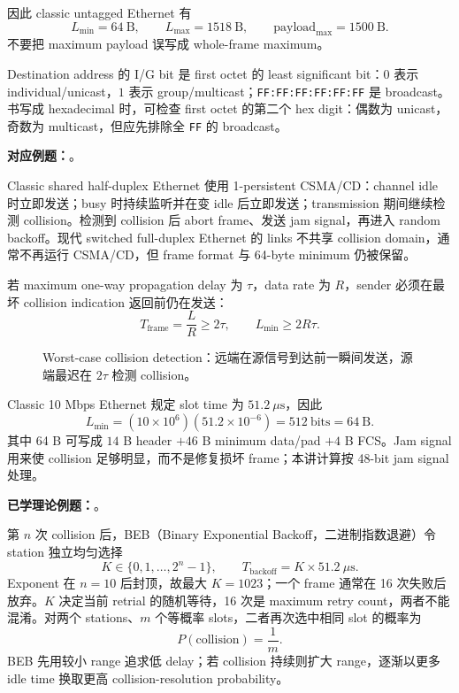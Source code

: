 因此 classic untagged Ethernet 有
\[
  \boxed{L_{\min}=64\ \text{B}},
  \qquad
  \boxed{L_{\max}=1518\ \text{B}},
  \qquad
  \boxed{\text{payload}_{\max}=1500\ \text{B}}.
\]
不要把 maximum payload 误写成 whole-frame maximum。

Destination address 的 I/G bit 是 first octet 的 least significant bit：$0$ 表示 individual/unicast，$1$ 表示 group/multicast；\texttt{FF:FF:FF:FF:FF:FF} 是 broadcast。书写成 hexadecimal 时，可检查 first octet 的第二个 hex digit：偶数为 unicast，奇数为 multicast，但应先排除全 \texttt{FF} 的 broadcast。

\textbf{对应例题：}。


Classic shared half-duplex Ethernet 使用 1-persistent CSMA/CD：channel idle 时立即发送；busy 时持续监听并在变 idle 后立即发送；transmission 期间继续检测 collision。检测到 collision 后 abort frame、发送 jam signal，再进入 random backoff。现代 switched full-duplex Ethernet 的 links 不共享 collision domain，通常不再运行 CSMA/CD，但 frame format 与 64-byte minimum 仍被保留。

若 maximum one-way propagation delay 为 $\tau$，data rate 为 $R$，sender 必须在最坏 collision indication 返回前仍在发送：
\[
  T_{\mathrm{frame}}=\frac{L}{R}\ge 2\tau,
  \qquad
  \boxed{L_{\min}\ge2R\tau}.
\]

\begin{figure}[htbp]
  \centering
  \resizebox{0.86\textwidth}{!}{}
  \caption{Worst-case collision detection：远端在源信号到达前一瞬间发送，源端最迟在 $2\tau$ 检测 collision。}
  \label{fig:sc2008-l04-csma-cd-timing}
\end{figure}

Classic 10 Mbps Ethernet 规定 slot time 为 $51.2\ \mu\mathrm{s}$，因此
\[
  L_{\min}=(10\times10^6)(51.2\times10^{-6})
  =512\ \text{bits}=64\ \text{B}.
\]
其中 64 B 可写成 $14$ B header $+46$ B minimum data/pad $+4$ B FCS。Jam signal 用来使 collision 足够明显，而不是修复损坏 frame；本讲计算按 48-bit jam signal 处理。

\textbf{已学理论例题：}。


第 $n$ 次 collision 后，BEB（Binary Exponential Backoff，二进制指数退避）令 station 独立均匀选择
\[
  K\in\{0,1,\ldots,2^n-1\},
  \qquad
  \boxed{T_{\mathrm{backoff}}=K\times51.2\ \mu\mathrm{s}}.
\]
Exponent 在 $n=10$ 后封顶，故最大 $K=1023$；一个 frame 通常在 16 次失败后放弃。$K$ 决定当前 retrial 的随机等待，16 次是 maximum retry count，两者不能混淆。对两个 stations、$m$ 个等概率 slots，二者再次选中相同 slot 的概率为
\[
  \boxed{P(\text{collision})=\frac{1}{m}}.
\]
BEB 先用较小 range 追求低 delay；若 collision 持续则扩大 range，逐渐以更多 idle time 换取更高 collision-resolution probability。

